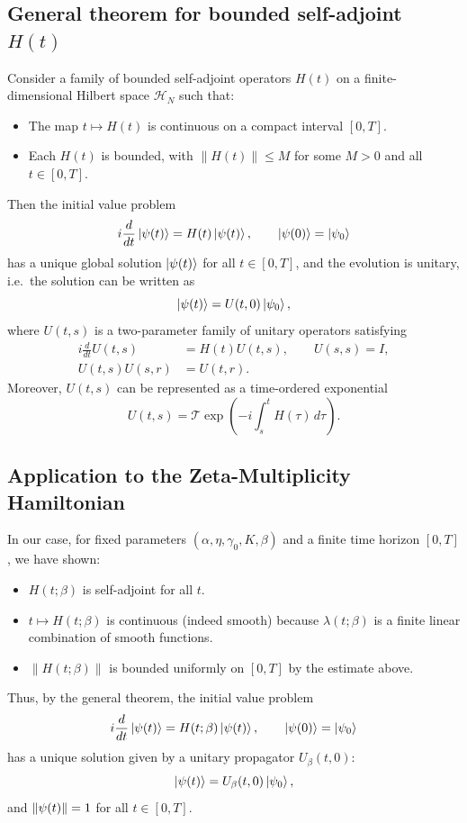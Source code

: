 \documentclass[11pt]{article}
\begin{document}
\subsection{General theorem for bounded self-adjoint $H(t)$}

Consider a family of bounded self-adjoint operators $H(t)$ on a finite-dimensional Hilbert space $\mathcal{H}_N$ such that:
\begin{itemize}
  \item The map $t\mapsto H(t)$ is continuous on a compact interval $[0,T]$.
  \item Each $H(t)$ is bounded, with $\|H(t)\|\le M$ for some $M>0$ and all $t\in[0,T]$.
\end{itemize}
Then the initial value problem
\begin{equation}
i\frac{d}{dt}\ket{\psi(t)} = H(t)\ket{\psi(t)},\qquad \ket{\psi(0)}=\ket{\psi_0}
\end{equation}
has a unique global solution $\ket{\psi(t)}$ for all $t\in[0,T]$, and the evolution is unitary, i.e.\ the solution can be written as
\begin{equation}
\ket{\psi(t)} = U(t,0)\ket{\psi_0},
\end{equation}
where $U(t,s)$ is a two-parameter family of unitary operators satisfying
\begin{align}
i\frac{d}{dt}U(t,s) &= H(t)U(t,s),\qquad U(s,s)=I,\\
U(t,s)U(s,r) &= U(t,r).
\end{align}
Moreover, $U(t,s)$ can be represented as a time-ordered exponential
\begin{equation}
U(t,s) = \mathcal{T}\exp\left(-i\int_s^t H(\tau)\,d\tau\right).
\end{equation}

\subsection{Application to the Zeta-Multiplicity Hamiltonian}

In our case, for fixed parameters $(\alpha,\eta,\gamma_0,K,\beta)$ and a finite time horizon $[0,T]$, we have shown:
\begin{itemize}
  \item $H(t;\beta)$ is self-adjoint for all $t$.
  \item $t\mapsto H(t;\beta)$ is continuous (indeed smooth) because $\lambda(t;\beta)$ is a finite linear combination of smooth functions.
  \item $\|H(t;\beta)\|$ is bounded uniformly on $[0,T]$ by the estimate above.
\end{itemize}
Thus, by the general theorem, the initial value problem
\begin{equation}
i\frac{d}{dt}\ket{\psi(t)} = H(t;\beta)\ket{\psi(t)},\qquad \ket{\psi(0)}=\ket{\psi_0}
\end{equation}
has a unique solution given by a unitary propagator $U_\beta(t,0)$:
\[
\ket{\psi(t)} = U_\beta(t,0)\ket{\psi_0},
\]
and $\norm{\psi(t)}=1$ for all $t\in[0,T]$.
\end{document}
